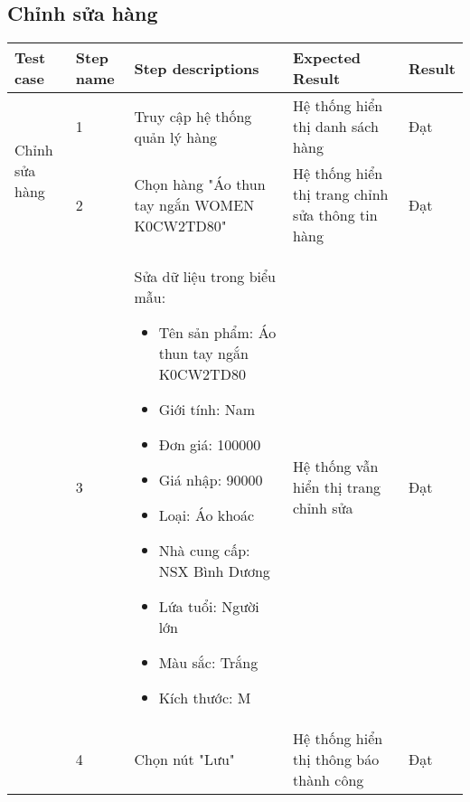 \subsection{Chỉnh sửa hàng}
{
    \setlength\extrarowheight{6pt}
    \begin{longtable}{| p{2.5cm}| p{1cm}| p{5.5cm}| p{4.5cm} | p{1.5cm} |}
        \hline
        \textbf{Test case} & \textbf{Step name} & \textbf{Step descriptions} & \textbf{Expected Result} & \textbf{Result} \\
        \hline
        \multirow[t]{2}{2.5cm}{Chỉnh sửa hàng} & 1 & Truy cập hệ thống quản lý hàng & Hệ thống hiển thị danh sách hàng & Đạt \\
        \cline{2-5}
         & 2 & Chọn hàng "Áo thun tay ngắn WOMEN K0CW2TD80" & Hệ thống hiển thị trang chỉnh sửa thông tin hàng & Đạt \\
        \cline{2-5}
        & 3 & Sửa dữ liệu trong biểu mẫu:
        \begin{itemize}
            \item Tên sản phẩm: Áo thun tay ngắn K0CW2TD80
            \item Giới tính: Nam
            \item Đơn giá: 100000
            \item Giá nhập: 90000
            \item Loại: Áo khoác
            \item Nhà cung cấp: NSX Bình Dương
            \item Lứa tuổi: Người lớn
            \item Màu sắc: Trắng
            \item Kích thước: M
        \end{itemize} & Hệ thống vẫn hiển thị trang chỉnh sửa & Đạt \\
        \cline{2-5}
         & 4 & Chọn nút "Lưu" & Hệ thống hiển thị thông báo thành công & Đạt \\
        \hline
    \end{longtable} 
}

